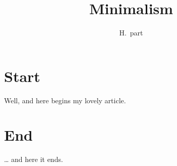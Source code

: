\documentclass[a4paper,11pt]{article}
\author{H.~part}
\title{Minimalism}
\begin{document}
\maketitle
\tableofcontents
\section{Start}
Well, and here begins my lovely article.
\section{End}
\ldots{} and here it     ends.
\end{document}
